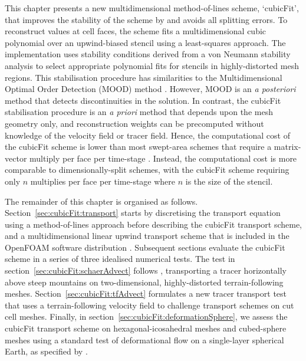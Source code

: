 This chapter presents a new multidimensional method-of-lines scheme, `cubicFit', that improves the stability of the scheme by \citet{weller-shahrokhi2014} and avoids all splitting errors.  To reconstruct values at cell faces, the scheme fits a multidimensional cubic polynomial over an upwind-biased stencil using a least-squares approach.
The implementation uses stability conditions derived from a von Neumann stability analysis to select appropriate polynomial fits for stencils in highly-distorted mesh regions.
This stabilisation procedure has similarities to the Multidimensional Optimal Order Detection (MOOD) method \citep{clain2011,diot2013}.
However, MOOD is an \textit{a posteriori} method that detects discontinuities in the solution.  In contrast, the cubicFit stabilisation procedure is an \textit{a priori} method that depends upon the mesh geometry only, and reconstruction weights can be precomputed without knowledge of the velocity field or tracer field.
Hence, the computational cost of the cubicFit scheme is lower than most swept-area schemes that require a matrix-vector multiply per face per time-stage .  Instead, the computational cost is more comparable to dimensionally-split schemes, with the cubicFit scheme requiring only $n$ multiplies per face per time-stage where $n$ is the size of the stencil.

The remainder of this chapter is organised as follows.
Section~\ref{sec:cubicFit:transport} starts by discretising the transport equation using a method-of-lines approach before describing the cubicFit transport scheme, and a multidimensional linear upwind transport scheme that is included in the OpenFOAM software distribution \citep{openfoam-numerics}.
Subsequent sections evaluate the cubicFit scheme in a series of three idealised numerical tests.
The test in section~\ref{sec:cubicFit:schaerAdvect} follows \citet{schaer2002}, transporting a tracer horizontally above steep mountains on two-dimensional, highly-distorted terrain-following meshes.
Section~\ref{sec:cubicFit:tfAdvect} formulates a new tracer transport test that uses a terrain-following velocity field to challenge transport schemes on cut cell meshes.
Finally, in section~\ref{sec:cubicFit:deformationSphere}, we assess the cubicFit transport scheme on hexagonal-icosahedral meshes and cubed-sphere meshes using a standard test of deformational flow on a single-layer spherical Earth, as specified by \citet{lauritzen2012}.








